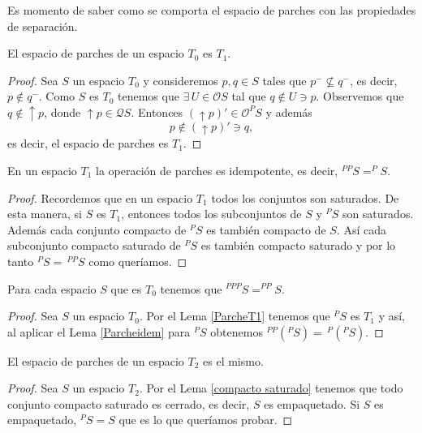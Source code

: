 Es momento de saber como se comporta el espacio de parches con las propiedades de separación.

\begin{lem}\label{ParcheT1}
    El espacio de parches de un espacio $T_0$ es $T_1$.
\end{lem}

\begin{proof}
    Sea $S$ un espacio $T_0$ y consideremos $p, q\in S$ tales que $p^-\nsubseteq q^-$, es decir, $p\notin q^-$. Como $S$ es $T_0$ tenemos que $\exists \,U\in \mathcal{O}S$ tal que $q\notin U\ni p$. Observemos que $q\notin \uparrow p$, donde $\uparrow p\in \mathcal{Q}S$. Entonces $(\uparrow p)'\in \mathcal{O}^PS$ y además 
    \[
    p \notin (\uparrow p)'\ni q,
    \]
    es decir, el espacio de parches es $T_1$.
\end{proof}

\begin{lem}\label{Parcheidem}
    En un espacio $T_1$ la operación de parches es idempotente, es decir, $^{PP}S=^PS$.
\end{lem}

\begin{proof}
    Recordemos que en un espacio $T_1$ todos los conjuntos son saturados. De esta manera, si $S$ es $T_1$, entonces todos los subconjuntos de $S$ y $^PS$ son saturados. Además cada conjunto compacto de $^PS$ es también compacto de $S$. Así cada subconjunto compacto saturado de $^PS$ es también compacto saturado y por lo tanto $^PS=\,^{PP}S$ como queríamos.  
\end{proof}

\begin{cor}
    Para cada espacio $S$ que es $T_0$ tenemos que $^{PPP}S=^{PP}S$.
\end{cor}

\begin{proof}
    Sea $S$ un espacio $T_0$. Por el Lema \ref{ParcheT1} tenemos que $^PS$ es $T_1$ y así, al aplicar el Lema \ref{Parcheidem} para $^PS$ obtenemos $^{PP}(^PS)=\,^P(^PS)$.
\end{proof}

\begin{lem}\label{ParcheT2}
    El espacio de parches de un espacio $T_2$ es el mismo.
\end{lem}

\begin{proof}
    Sea $S$ un espacio $T_2$. Por el Lema \ref{compacto saturado} tenemos que todo conjunto compacto saturado es cerrado, es decir, $S$ es empaquetado. Si $S$ es empaquetado, $^PS=S$ que es lo que queríamos probar.
\end{proof}

